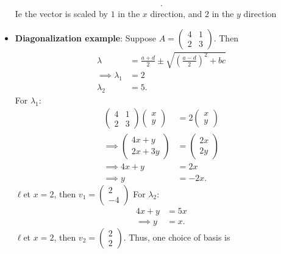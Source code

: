 \documentclass{report}
\begin{document}
\begin{itemize}
\begin{align*}
            .\end{align*}
            Ie the vector is scaled by $1$ in the $x$ direction, and $2$ in the $y$ direction
        \item \textbf{Diagonalization example}: Suppose $A = \begin{pmatrix} 4 & 1 \\ 2 & 3 \end{pmatrix} $. Then
            \begin{align*}
                \lambda &= \frac{a+d}{2} \pm \sqrt{\left(\frac{a-d}{2}\right)^{2}  + bc} \\
                \implies \lambda_{1} &= 2 \\ \lambda_{2} &= 5
            .\end{align*}
            For $\lambda_{1}$:
            \begin{align*}
                \begin{pmatrix} 4 & 1 \\ 2 & 3 \end{pmatrix} \begin{pmatrix} x \\ y \end{pmatrix} &= 2\begin{pmatrix} x \\ y\end{pmatrix} \\
                \implies  \begin{pmatrix} 4x + y \\ 2x + 3y \end{pmatrix} &= \begin{pmatrix} 2x \\ 2y\end{pmatrix} \\
                \implies 4x + y &= 2x \\
                \implies y &= -2x
            .\end{align*}
            $\ell$et $x=2$, then $v_{1} = \begin{pmatrix} 2 \\ -4 \end{pmatrix}$
            \bigbreak \noindent 
            For $\lambda_{2}$:
            \begin{align*}
                4x + y &= 5x \\
                \implies y &=x
            .\end{align*}
            $\ell$et $x=2$, then $v_{2} = \begin{pmatrix} 2 \\2 \end{pmatrix}$. Thus, one choice of basis is

\end{itemize}
\end{document}
